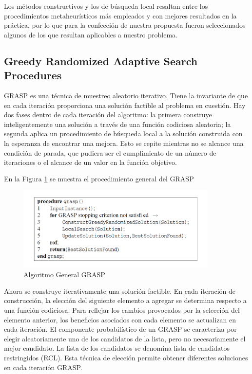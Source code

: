 \documentclass[a4paper,12pt]{book}
\begin{document}
		Los métodos constructivos y los de búsqueda local resaltan entre los procedimientos metaheurísticos más empleados y con mejores resultados en la práctica, por lo que para la confección de nuestra propuesta fueron seleccionados algunos de los que resultan aplicables a nuestro problema. 
	
	
		\subsection{Greedy Randomized Adaptive Search Procedures} 
		GRASP \cite{GRASP} es una técnica de muestreo aleatorio iterativo. Tiene la invariante de que en cada iteración proporciona una solución factible al problema en cuestión. Hay dos fases dentro de cada iteración del algoritmo: la primera construye inteligentemente una solución a través de una función codiciosa aleatoria; la segunda aplica un procedimiento de búsqueda local a la solución construida con la esperanza de encontrar una mejora. Esto se repite mientras no se alcance una condición de parada, que pudiera ser el cumplimiento de un número de iteraciones o el alcance de un valor en la función objetivo.
		
		En la Figura \ref{GRASPgeneral} se muestra el procedimiento general del GRASP
		
		\begin{figure}[h]
			\centering
			\includegraphics[width=10cm]{./Graphics/GRASPgeneral.png}
			\caption{Algoritmo General GRASP}
			\label{GRASPgeneral}
		\end{figure}
		
		Ahora se construye iterativamente una solución factible. En cada iteración de construcción, la elección del siguiente elemento a agregar se determina respecto a una función codiciosa. Para reflejar los cambios provocados por la selección del elemento anterior, los beneficios asociados con cada elemento se actualizan en cada iteración. El componente probabilístico de un GRASP se caracteriza por elegir aleatoriamente uno de los candidatos de la lista, pero no necesariamente el mejor candidato. La lista de los candidatos se denomina lista de candidatos restringidos (RCL). Esta técnica de elección permite obtener diferentes soluciones en cada iteración GRASP.
		
\end{document}
